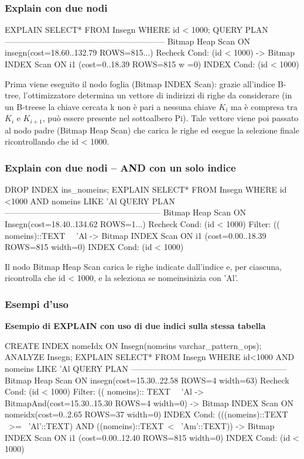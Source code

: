 \subsubsection{Explain con due nodi}
\begin{codiceSQL}
EXPLAIN SELECT* FROM Insegn WHERE id < 1000;
QUERY PLAN
-----------------------------------------------------------
Bitmap Heap Scan ON insegn(cost=18.60..132.79 ROWS=815...)
Recheck Cond: (id < 1000)
-> Bitmap INDEX Scan ON i1 (cost=0..18.39 ROWS=815 w =0)
INDEX Cond: (id < 1000)  
\end{codiceSQL}
Prima viene eseguito il nodo foglia (Bitmap INDEX Scan): grazie all’indice B-tree, l’ottimizzatore determina un vettore di indirizzi di righe da considerare (in un B-treese la chiave cercata k non è pari a nessuna chiave $K_i$ ma è compresa tra $K_i$ e $K_{i+1}$, può essere presente nel sottoalbero Pi).
Tale vettore viene poi passato al nodo padre (Bitmap Heap Scan) che carica le righe ed esegue la selezione finale ricontrollando che id < 1000.

\subsubsection{Explain con due nodi – AND con un solo indice}
\begin{codiceSQL}
DROP INDEX ins_nomeins; 
EXPLAIN SELECT* FROM Insegn WHERE id <1000 AND nomeins LIKE 'Al%
QUERY PLAN
---------------------------------------------------------
Bitmap Heap Scan ON Insegn(cost=18.40..134.62 ROWS=1...)
Recheck Cond: (id < 1000)
Filter: (( nomeins)::TEXT~~ 'Al%
-> Bitmap INDEX Scan ON i1 (cost=0.00..18.39 ROWS=815 width=0)
INDEX Cond: (id < 1000)  
\end{codiceSQL}
Il nodo Bitmap Heap Scan carica le righe indicate dall'indice e, per ciascuna, ricontrolla che id < 1000, e la seleziona se nomeinsinizia con 'Al'.


\subsubsection{Esempi d'uso}

\textbf{Esempio di EXPLAIN con uso di due indici sulla stessa tabella}

\begin{codiceSQL}
  CREATE INDEX nomeIdx ON Insegn(nomeins varchar_pattern_ops);
ANALYZE Insegn;
EXPLAIN SELECT* FROM Insegn WHERE id<1000 AND nomeins LIKE 'Al%
QUERY PLAN
---------------------------------------------------------
Bitmap Heap Scan ON insegn(cost=15.30..22.58 ROWS=4 width=63)
Recheck Cond: (id < 1000)
Filter: (( nomeins):: TEXT~~ 'Al%
-> BitmapAnd(cost=15.30..15.30 ROWS=4 width=0)
-> Bitmap INDEX Scan ON nomeidx(cost=0..2.65 ROWS=37 width=0)
INDEX Cond: (((nomeins)::TEXT ~>=~ 'Al'::TEXT) AND
((nomeins)::TEXT~<~ 'Am'::TEXT))
-> Bitmap INDEX Scan ON i1 (cost=0.00..12.40 ROWS=815 width=0)
INDEX Cond: (id < 1000)
\end{codiceSQL}

